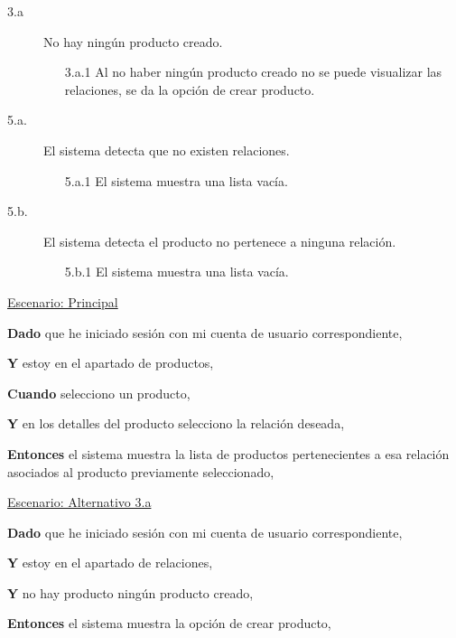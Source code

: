 \begin{description}

    \item[3.a] No hay ningún producto creado.
    \begin{enumerate}
        \item[3.a.1] Al no haber ningún producto creado no se puede visualizar las relaciones, se da la opción de crear producto.
    \end{enumerate}
    \item[5.a.] El sistema detecta que no existen relaciones.
    \begin{enumerate}
        \item[5.a.1] El sistema muestra una lista vacía.
    \end{enumerate}
    \item[5.b.] El sistema detecta el producto no pertenece a ninguna relación.
    \begin{enumerate}
        \item[5.b.1] El sistema muestra una lista vacía.
    \end{enumerate}

\end{description}

\underline{Escenario: Principal}\par
\vspace{0.15cm}

\textbf{Dado} que he iniciado sesión con mi cuenta de usuario correspondiente,\par
\textbf{Y} estoy en el apartado de productos,\par
\textbf{Cuando} selecciono un producto,\par
\textbf{Y} en los detalles del producto selecciono la relación deseada,\par
\textbf{Entonces} el sistema muestra la lista de productos pertenecientes a esa relación asociados al producto previamente seleccionado,\par

\vspace{0.20cm}
\underline{Escenario: Alternativo 3.a}
\vspace{0.15cm}

\textbf{Dado} que he iniciado sesión con mi cuenta de usuario correspondiente,\par
\textbf{Y} estoy en el apartado de relaciones,\par
\textbf{Y} no hay producto ningún producto creado,\par
\textbf{Entonces} el sistema muestra la opción de crear producto,\par


